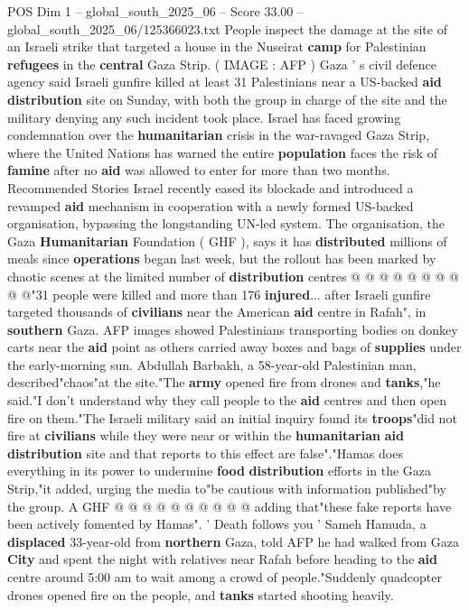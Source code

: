 \begin{textsample}{POS Dim 1 – global\_south\_2025\_06 – Score 33.00 – global\_south\_2025\_06/125366023.txt}  \label{ex:f1_pos_136}
People inspect the damage at the site of an Israeli strike that targeted a house in the Nuseirat \textbf{camp} for Palestinian \textbf{refugees} in the \textbf{central} Gaza Strip. ( IMAGE : AFP ) Gaza ' s civil defence agency said Israeli gunfire killed at least 31 Palestinians near a US-backed \textbf{aid} \textbf{distribution} site on Sunday, with both the group in charge of the site and the military denying any such incident took place.
Israel has faced growing condemnation over the \textbf{humanitarian} crisis in the war-ravaged Gaza Strip, where the United Nations has warned the entire \textbf{population} faces the risk of \textbf{famine} after no \textbf{aid} was allowed to enter for more than two months.
Recommended Stories Israel recently eased its blockade and introduced a revamped \textbf{aid} mechanism in cooperation with a newly formed US-backed organisation, bypassing the longstanding UN-led system.
The organisation, the Gaza \textbf{Humanitarian} Foundation ( GHF ), says it has \textbf{distributed} millions of meals since \textbf{operations} began last week, but the rollout has been marked by chaotic scenes at the limited number of \textbf{distribution} centres @ @ @ @ @ @ @ @ @ @"31 people were killed and more than 176 \textbf{injured}... after Israeli gunfire targeted thousands of \textbf{civilians} near the American \textbf{aid} centre in Rafah", in \textbf{southern} Gaza.
AFP images showed Palestinians transporting bodies on donkey carts near the \textbf{aid} point as others carried away boxes and bags of \textbf{supplies} under the early-morning sun.
Abdullah Barbakh, a 58-year-old Palestinian man, described"chaos"at the site."The \textbf{army} opened fire from drones and \textbf{tanks},"he said."I don't understand why they call people to the \textbf{aid} centres and then open fire on them."The Israeli military said an initial inquiry found its \textbf{troops}"did not fire at \textbf{civilians} while they were near or within the \textbf{humanitarian} \textbf{aid} \textbf{distribution} site and that reports to this effect are false"."Hamas does everything in its power to undermine \textbf{food} \textbf{distribution} efforts in the Gaza Strip,"it added, urging the media to"be cautious with information published"by the group.
A GHF @ @ @ @ @ @ @ @ @ @ adding that"these fake reports have been actively fomented by Hamas". ' Death follows you ' Sameh Hamuda, a \textbf{displaced} 33-year-old from \textbf{northern} Gaza, told AFP he had walked from Gaza \textbf{City} and spent the night with relatives near Rafah before heading to the \textbf{aid} centre around 5:00 am to wait among a crowd of people."Suddenly quadcopter drones opened fire on the people, and \textbf{tanks} started shooting heavily.

\end{textsample}
